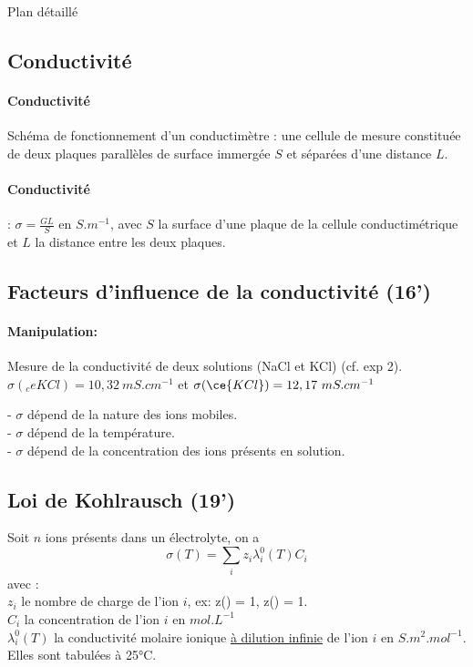 \begin{reportBlock}{Plan détaillé}
\subsection{Conductivité}

\paragraph*{Conductivité} Schéma de fonctionnement d'un conductimètre : une cellule de mesure constituée de deux plaques parallèles de surface immergée $S$ et séparées d'une distance $L$. \\

\paragraph*{Conductivité}: $\sigma = \frac{G L}{S}$ en $S.m^{-1}$, avec $S$ la surface d'une plaque de la cellule conductimétrique et $L$ la distance entre les deux plaques.


\subsection{Facteurs d'influence de la conductivité (16')}

\paragraph*{Manipulation: } Mesure de la conductivité de deux solutions (NaCl et KCl) (cf. exp 2). $\sigma(_ce{KCl}) = 10,32~mS.cm^{-1}$ et $\sigma(\ce{KCl}) = 12,17~mS.cm^{-1}$

- $\sigma$ dépend de la nature des ions mobiles. \\
- $\sigma$ dépend de la température.\\
- $\sigma$ dépend de la concentration des ions présents en solution.

\subsection{Loi de Kohlrausch (19')}

Soit $n$ ions présents dans un électrolyte, on a 
\begin{equation}
\sigma(T) = \sum_i z_i \lambda_i^0(T) C_i
\end{equation}
avec : \\
$z_i$ le nombre de charge de l'ion $i$, ex: z() = 1, z() = 1. \\
$C_i$ la concentration de l'ion $i$ en $mol.L^{-1}$  \\
$\lambda_i^0(T)$ la conductivité molaire ionique \color{purple} \underline{à dilution infinie} \color{black} de l'ion $i$ en $S.m^2.mol^{-1}$. Elles sont tabulées à 25°C.



\end{reportBlock}
